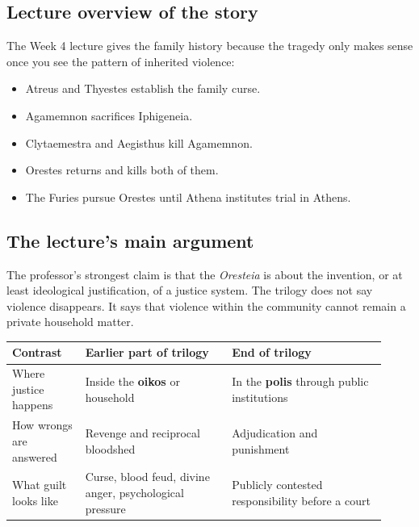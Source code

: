 \documentclass[11pt]{article}
\newcommand{\keyterm}[1]{\textbf{#1}}
\begin{document}
\subsection*{Lecture overview of the story}
The Week 4 lecture gives the family history because the tragedy only makes sense once you see the pattern of inherited violence:

\begin{itemize}
\item Atreus and Thyestes establish the family curse.
\item Agamemnon sacrifices Iphigeneia.
\item Clytaemestra and Aegisthus kill Agamemnon.
\item Orestes returns and kills both of them.
\item The Furies pursue Orestes until Athena institutes trial in Athens.
\end{itemize}

\subsection*{The lecture's main argument}
The professor's strongest claim is that the \textit{Oresteia} is about the invention, or at least ideological justification, of a justice system. The trilogy does not say violence disappears. It says that violence within the community cannot remain a private household matter.

\begin{tabular}{@{}p{0.18\linewidth}p{0.36\linewidth}p{0.38\linewidth}@{}}
\toprule
\textbf{Contrast} & \textbf{Earlier part of trilogy} & \textbf{End of trilogy} \\
\midrule
Where justice happens & Inside the \keyterm{oikos} or household & In the \keyterm{polis} through public institutions \\
How wrongs are answered & Revenge and reciprocal bloodshed & Adjudication and punishment \\
What guilt looks like & Curse, blood feud, divine anger, psychological pressure & Publicly contested responsibility before a court \\
\bottomrule
\end{tabular}
\end{document}
